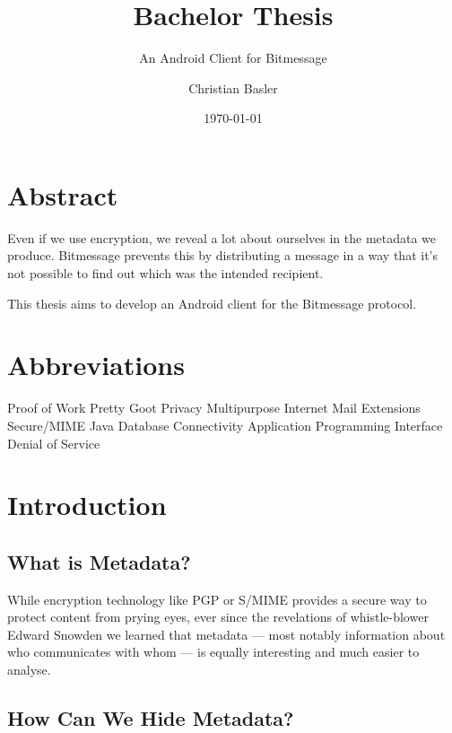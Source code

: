 \documentclass{bfh}
\title{Bachelor Thesis}
\subtitle{An Android Client for Bitmessage}
\author{Christian Basler}
\date{\today}
\begin{document}
  \maketitle

  \tableofcontents

  \newpage
  \section*{Abstract}

  Even if we use encryption, we reveal a lot about ourselves in the metadata we produce. Bitmessage prevents this by distributing a message in a way that it's not possible to find out which was the intended recipient.
  
  This thesis aims to develop an Android client for the Bitmessage protocol.
  
  \section*{Abbreviations}
  \begin{acronym}[Bash]
        {Proof of Work}
        {Pretty Goot Privacy}
       {Multipurpose Internet Mail Extensions}
     {Secure/\acs{MIME}}
       {Java Database Connectivity}
        {Application Programming Interface}
        {Denial of Service}
  \end{acronym}

  \newpage

  \section{Introduction}

  \subsection{What is Metadata?}

  While encryption technology like \ac{PGP} or \acs{S/MIME} provides a secure way to protect content from prying eyes, ever since the revelations of whistle-blower Edward Snowden we learned that metadata --- most notably information about who communicates with whom --- is equally interesting and much easier to analyse.\cite{guardian:metadata}

  \subsection{How Can We Hide Metadata?}
\end{document}
